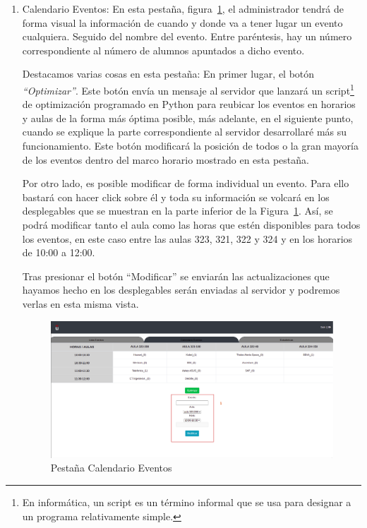\documentclass[a4paper, 12pt]{book}
\begin{document}
\begin{enumerate}
	\item Calendario Eventos: En esta pestaña, figura~\ref{fig:adminCalendario}, el administrador tendrá de forma visual la información de cuando y donde va a tener lugar un evento cualquiera. Seguido del nombre del evento. Entre paréntesis, hay un número correspondiente al número de alumnos apuntados a dicho evento.
	
	Destacamos varias cosas en esta pestaña: En primer lugar, el botón \textit{``Optimizar''}. Este botón envía un mensaje al servidor que lanzará un script\footnote{En informática, un script es un término informal que se usa para designar a un programa relativamente simple.} de optimización programado en Python para reubicar los eventos en horarios y aulas de la forma más óptima posible, más adelante, en el siguiente punto, cuando se explique la parte correspondiente al servidor desarrollaré más su funcionamiento. Este botón modificará la posición de todos o la gran mayoría de los eventos dentro del marco horario mostrado en esta pestaña.
	
	Por otro lado, es posible modificar de forma individual un evento. Para ello bastará con hacer click sobre él y toda su información se volcará en los desplegables que se muestran en la parte inferior de la Figura~\ref{fig:adminCalendario}. Así, se podrá modificar tanto el aula como las horas que estén disponibles para todos los eventos, en este caso entre las aulas 323, 321, 322 y 324 y en los horarios de 10:00 a 12:00. 
	
	Tras presionar el botón ``Modificar'' se enviarán las actualizaciones que hayamos hecho en los desplegables serán enviadas al servidor y podremos verlas en esta misma vista.
	
	\begin{figure}[h!]
  	\centering
  	\includegraphics[width=16cm, keepaspectratio]{img/adminCalendario.png}
  	\caption{Pestaña Calendario Eventos}\label{fig:adminCalendario}
	\end{figure}
	


\end{enumerate}
\end{document}

